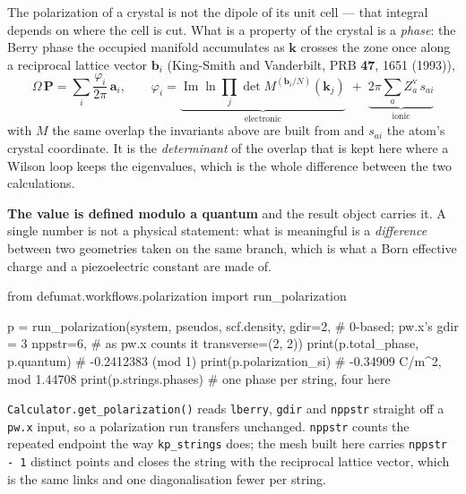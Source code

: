 \documentclass[11pt,a4paper]{article}
\newcommand{\code}[1]{\texttt{\small #1}}
\begin{document}
The polarization of a crystal is not the dipole of its unit cell --- that
integral depends on where the cell is cut. What is a property of the crystal is
a \emph{phase}: the Berry phase the occupied manifold accumulates as $\mathbf k$
crosses the zone once along a reciprocal lattice vector $\mathbf b_i$
(King-Smith and Vanderbilt, PRB \textbf{47}, 1651 (1993)),
\begin{equation*}
  \Omega\,\mathbf P = \sum_i \frac{\varphi_i}{2\pi}\,\mathbf a_i,
  \qquad
  \varphi_i = \underbrace{\operatorname{Im}\ln \prod_{j}
    \det M^{(\mathbf b_i/N)}(\mathbf k_j)}_{\text{electronic}}
  \;+\; \underbrace{2\pi\sum_a Z^{\mathrm v}_a\, s_{a i}}_{\text{ionic}}
\end{equation*}
with $M$ the same overlap the invariants above are built from and $s_{ai}$ the
atom's crystal coordinate. It is the \emph{determinant} of the overlap that is
kept here where a Wilson loop keeps the eigenvalues, which is the whole
difference between the two calculations.

\textbf{The value is defined modulo a quantum} and the result object carries it.
A single number is not a physical statement: what is meaningful is a
\emph{difference} between two geometries taken on the same branch, which is what
a Born effective charge and a piezoelectric constant are made of.

\begin{pycode}
from defumat.workflows.polarization import run_polarization

p = run_polarization(system, pseudos, scf.density,
                     gdir=2,            # 0-based; pw.x's gdir = 3
                     nppstr=6,          # as pw.x counts it
                     transverse=(2, 2))
print(p.total_phase, p.quantum)         # -0.2412383  (mod 1)
print(p.polarization_si)                # -0.34909 C/m^2, mod 1.44708
print(p.strings.phases)                 # one phase per string, four here
\end{pycode}

\code{Calculator.get\_polarization()} reads \code{lberry}, \code{gdir} and
\code{nppstr} straight off a \code{pw.x} input, so a polarization run transfers
unchanged. \code{nppstr} counts the repeated endpoint the way \code{kp\_strings}
does; the mesh built here carries \code{nppstr - 1} distinct points and closes
the string with the reciprocal lattice vector, which is the same links and one
diagonalisation fewer per string.
\end{document}
